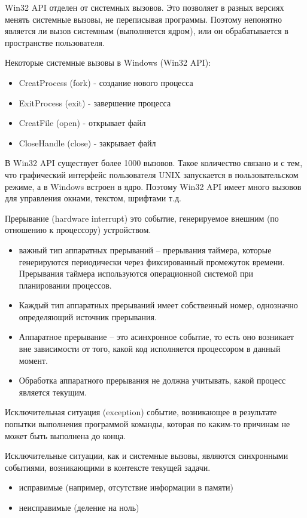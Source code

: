 \documentclass{beamer}
\begin{document}
\begin{frame}[t]
Win32 API отделен от системных вызовов. Это позволяет в разных версиях менять системные вызовы, не переписывая программы. Поэтому непонятно является ли вызов системным (выполняется ядром), или он обрабатывается в пространстве пользователя.

Некоторые системные вызовы в Windows (Win32 API):
\begin{itemize}
\item CreatProcess (fork) - создание нового процесса
\item ExitProcess (exit) - завершение процесса
\item CreatFile (open) - открывает файл
\item CloseHandle (close) - закрывает файл
\end{itemize}
В Win32 API существует более 1000 вызовов. Такое количество связано и с тем, что графический интерфейс пользователя UNIX запускается в пользовательском режиме, а в Windows встроен в ядро. Поэтому Win32 API имеет много вызовов для управления окнами, текстом, шрифтами т.д.
\end{frame}

\begin{frame}[t]
\begin{block}{Прерывание (hardware interrupt)}
это событие, генерируемое внешним (по отношению к процессору) устройством.
\end{block}
\begin{itemize}
\item важный тип аппаратных прерываний – прерывания таймера, которые генерируются периодически через фиксированный промежуток времени. Прерывания таймера используются операционной системой при планировании процессов. 
\item Каждый тип аппаратных прерываний имеет собственный номер, однозначно определяющий источник прерывания.
\item Аппаратное прерывание – это асинхронное событие, то есть оно возникает вне зависимости от того, какой код исполняется процессором в данный момент. 
\item Обработка аппаратного прерывания не должна учитывать, какой процесс является текущим.
\end{itemize}
\end{frame}

\begin{frame}[t]
\begin{block}{Исключительная ситуация (exception)}
событие, возникающее в результате попытки выполнения программой команды, которая по каким-то причинам не может быть выполнена до конца.
\end{block}
Исключительные ситуации, как и системные вызовы, являются синхронными событиями, возникающими в контексте текущей задачи. 
\begin{itemize}
\item исправимые (например, отсутствие информации в памяти)
\item неисправимые (деление на ноль)
\end{itemize}
\end{frame}
\end{document}
